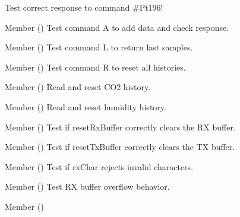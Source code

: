 \begin{DoxyRefList}
%
Test correct response to command \#\+Pt196!  
\item[Member \doxylink{test_8c_a40e2ae303a2ca8649accf2cc64fbeb0f}{test\+\_\+cmd\+Processor\+A\+\_\+add\+\_\+data} ()]\label{test__test000016}%
%
Test command \textquotesingle{}A\textquotesingle{} to add data and check response.  
\item[Member \doxylink{test_8c_ad82a2484a2eae7db278bbf88d3991ea9}{test\+\_\+cmd\+Processor\+L\+\_\+returns\+\_\+last\+\_\+samples} ()]\label{test__test000020}%
%
Test command \textquotesingle{}L\textquotesingle{} to return last samples.  
\item[Member \doxylink{test_8c_a8ac9db325cee3b1a11af0b428861be86}{test\+\_\+cmd\+Processor\+R\+\_\+reset\+\_\+history} ()]\label{test__test000021}%
%
Test command \textquotesingle{}R\textquotesingle{} to reset all histories.  
\item[Member \doxylink{test_8c_ab3b10cc678e6cec02d8653ca29e506db}{test\+\_\+co2\+\_\+ler\+\_\+co2\+\_\+e\+\_\+reset} ()]\label{test__test000015}%
%
Read and reset CO2 history.  
\item[Member \doxylink{test_8c_a44d76caca2d9aec9c0f3fcb000977f27}{test\+\_\+humidity\+\_\+ler\+\_\+hums\+\_\+e\+\_\+reset} ()]\label{test__test000014}%
%
Read and reset humidity history.  
\item[Member \doxylink{test_8c_a251055cd936f00cdcf7ca42de5b76e7d}{test\+\_\+reset\+Rx\+Buffer} ()]\label{test__test000001}%
%
Test if reset\+Rx\+Buffer correctly clears the RX buffer.  
\item[Member \doxylink{test_8c_a092218b17bb049bd11cb0fce2557528d}{test\+\_\+reset\+Tx\+Buffer} ()]\label{test__test000005}%
%
Test if reset\+Tx\+Buffer correctly clears the TX buffer.  
\item[Member \doxylink{test_8c_aeac96837e810e7e08f471975520d5fe3}{test\+\_\+rx\+Char\+\_\+invalido} ()]\label{test__test000003}%
%
Test if rx\+Char rejects invalid characters.  
\item[Member \doxylink{test_8c_aedae2008a79e95983a2ff595257cb17b}{test\+\_\+rx\+Char\+\_\+overflow} ()]\label{test__test000004}%
%
Test RX buffer overflow behavior.  
\item[Member \doxylink{test_8c_afc3841d181cf953d3538c40488c6c07c}{test\+\_\+rx\+Char\+\_\+valido} ()]\label{test__test000002}%

\end{DoxyRefList}
